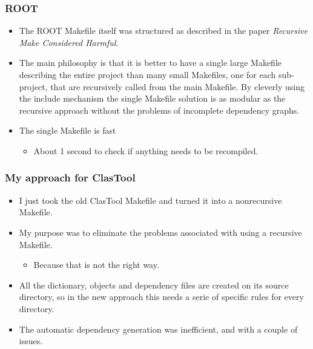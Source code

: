 \documentclass[11pt]{beamer}
\begin{document}

\begin{frame}
  \frametitle{ROOT}
  \begin{itemize}
    \item The ROOT Makefile itself was structured as described in the paper
      \emph{Recursive Make Considered Harmful}.\\[5mm]
    \item The main philosophy is that it is better to have a single large
      Makefile describing the entire project than many small Makefiles, one
      for each sub-project, that are recursively called from the main
      Makefile. By cleverly using the include mechanism the single Makefile
      solution is as modular as the recursive approach without the problems of
      incomplete dependency graphs.\\[5mm]
    \item The single Makefile is fast
      \begin{itemize}
        \item About 1 second to check if anything needs to be recompiled.
      \end{itemize}
  \end{itemize}
\end{frame}


\begin{frame}
  \frametitle{My approach for ClasTool}
  \begin{itemize}
    \item I just took the old ClasTool Makefile and turned it into a
      nonrecursive Makefile.\\[4mm]
    \item My purpose was to eliminate the problems associated with using a
      recursive Makefile. 

      \begin{itemize}
        \item Because that is not the right way.\\[4mm]
      \end{itemize}

    \item All the dictionary, objects and dependency files are created on its
      source directory, so in the new approach this needs a serie of specific
      rules for every directory.\\[4mm]
    \item The automatic dependency generation was inefficient, and with a
      couple of issues. 
  \end{itemize}
\end{frame}
\end{document}
